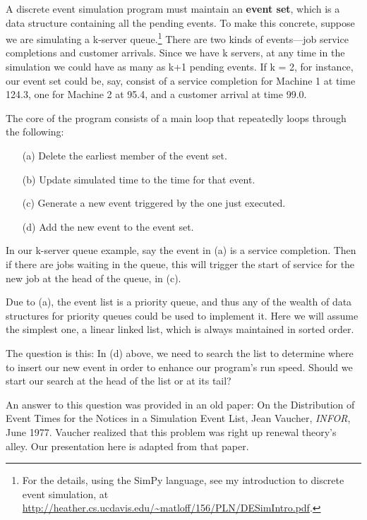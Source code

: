 A discrete event simulation program must maintain an {\bf event set},
which is a data structure containing all the pending events.  To make
this concrete, suppose we are simulating a k-server queue.\footnote{For
the details, using the SimPy language, see my introduction to
discrete event simulation, at
\url{http://heather.cs.ucdavis.edu/~matloff/156/PLN/DESimIntro.pdf}.}
There are two kinds of events---job service completions and customer
arrivals.  Since we have k servers, at any time in the simulation we
could have as many as k+1 pending events.  If k = 2, for instance, our
event set could be, say, consist of a service completion for Machine 1
at time 124.3, one for Machine 2 at 95.4, and a customer arrival at time
99.0.

The core of the program consists of a main loop that repeatedly loops
through the following:

\begin{itemize}

\item [(a)] Delete the earliest member of the event set.

\item [(b)] Update simulated time to the time for that event.

\item [(c)] Generate a new event triggered by the one just executed.

\item [(d)] Add the new event to the event set.

\end{itemize}

In our k-server queue example, say the event in (a) is a service
completion.  Then if there are jobs waiting in the queue, this will
trigger the start of service for the new job at the head of the queue,
in (c).

Due to (a), the event list is a priority queue, and thus any of the
wealth of data structures for priority queues could be used to implement
it.  Here we will assume the simplest one, a linear linked list, which
is always maintained in sorted order.

The question is this:  In (d) above, we need to search the list to
determine where to insert our new event in order to enhance our
program's run speed.  Should we start our search at the head of the list
or at its tail?  

An answer to this question was provided in an old paper: On the
Distribution of Event Times for the Notices in a Simulation Event List,
Jean Vaucher, {\it INFOR}, June 1977.  Vaucher realized that this
problem was right up renewal theory's alley.  Our presentation here is
adapted from that paper.

